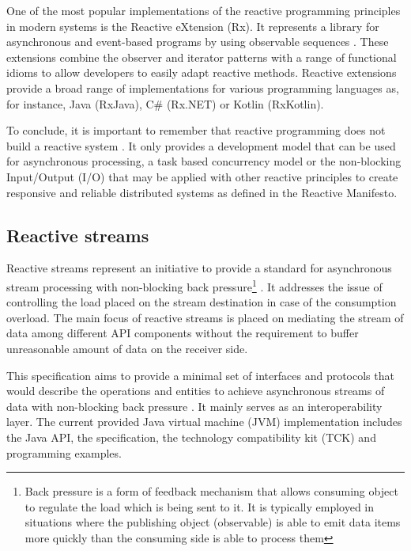 \documentclass[oneside,
  digital, %
  table,   %
  lof,     %
  lot,     %
]{fithesis3}
\begin{document}
One of the most popular implementations of the reactive programming principles in modern systems is the Reactive eXtension (Rx). It represents a library for asynchronous and event-based programs by using observable sequences \cite{rxJava}. These extensions combine the observer and iterator patterns with a range of functional idioms to allow developers to easily adapt reactive methods. Reactive extensions provide a broad range of implementations for various programming languages as, for instance, Java (RxJava), C\# (Rx.NET) or Kotlin (RxKotlin). 

To conclude, it is important to remember that reactive programming does not build a reactive system \cite{5thingsAboutRP_RHDev}. It only provides a development model that can be used for asynchronous processing, a task based concurrency model or the non-blocking Input/Output (I/O) that may be applied with other reactive principles to create responsive and reliable distributed systems as defined in the Reactive Manifesto.

\subsection{Reactive streams}

Reactive streams represent an initiative to provide a standard for asynchronous stream processing with non-blocking back pressure\footnote{Back pressure is a form of feedback mechanism that allows consuming object to regulate the load which is being sent to it. It is typically employed in situations where the publishing object (observable) is able to emit data items more quickly than the consuming side is able to process them} \cite{reactive_streams}. It addresses the issue of controlling the load placed on the stream destination in case of the consumption overload. The main focus of reactive streams is placed on mediating the stream of data among different API components without the requirement to buffer unreasonable amount of data on the receiver side. 

This specification aims to provide a minimal set of interfaces and protocols that would describe the operations and entities to achieve asynchronous streams of data with non-blocking back pressure \cite{building_reactive_ms_in_java}. It mainly serves as an interoperability layer. The current provided Java virtual machine (JVM) implementation includes the Java API, the specification, the technology compatibility kit (TCK) and programming examples. 
\end{document}

